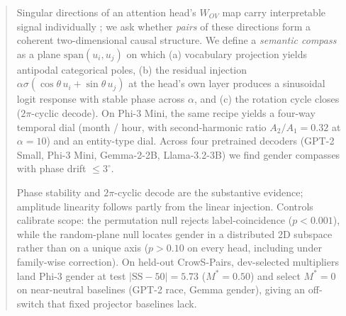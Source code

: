 \begin{abstract}
Singular directions of an attention head's $W_{OV}$ map carry
interpretable signal individually
\citep{elhage2021mathematical,millidge2022svd,ahmad2025beyond};
we ask whether \emph{pairs} of these directions form a coherent
two-dimensional causal structure. We define a \emph{semantic
compass} as a plane $\mathrm{span}(u_i, u_j)$ on which
(a) vocabulary projection yields antipodal categorical poles,
(b) the residual injection
$\alpha\sigma(\cos\theta\,u_i + \sin\theta\,u_j)$ at the head's
own layer produces a sinusoidal logit response with stable phase
across $\alpha$, and (c) the rotation cycle closes
($2\pi$-cyclic decode).
On Phi-3 Mini, the same recipe yields a four-way temporal dial
(month / hour, with second-harmonic ratio $A_2/A_1 = 0.32$ at
$\alpha = 10$) and an entity-type dial. Across four pretrained
decoders (GPT-2 Small, Phi-3 Mini, Gemma-2-2B, Llama-3.2-3B) we find
gender compasses with phase drift $\leq 3^\circ$.

Phase stability and $2\pi$-cyclic decode are the substantive
evidence; amplitude linearity follows partly from the linear
injection. Controls calibrate scope: the permutation null rejects
label-coincidence ($p < 0.001$), while the random-plane null
locates gender in a distributed 2D subspace rather than on a unique
axis ($p > 0.10$ on every head, including under family-wise
correction). On held-out CrowS-Pairs, dev-selected multipliers
land Phi-3 gender at test $|\mathrm{SS}-50| = 5.73$ ($M^* = 0.50$)
and select $M^* = 0$ on near-neutral baselines (GPT-2 race, Gemma
gender), giving an off-switch that fixed projector baselines lack.
\end{abstract}
